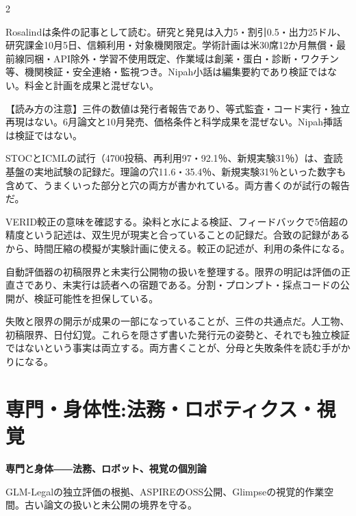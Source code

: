 \documentclass[lualatex,a4paper,10pt]{jlreq}
\begin{document}
\begin{multicols}{2} %

Rosalindは条件の記事として読む。研究と発見は入力5・割引0.5・出力25ドル、研究課金10月5日、信頼利用・対象機関限定。学術計画は米30席12か月無償・最前線同梱・API除外・学習不使用既定、作業域は創薬・蛋白・診断・ワクチン等、機関検証・安全連絡・監視つき。Nipah小話は編集要約であり検証ではない。料金と計画を成果と混ぜない。
\cite{B51,B52,B86,B87}


\begin{tcolorbox}[colback=SurveySoft,colframe=SurveyRule,arc=1mm,boxrule=0.4pt,left=2mm,right=2mm]
【読み方の注意】三件の数値は発行者報告であり、等式監査・コード実行・独立再現はない。6月論文と10月発売、価格条件と科学成果を混ぜない。Nipah挿話は検証ではない。
\end{tcolorbox}
\cite{B46,B83,B44,B43,B45,B47,B84,B48,B50,B85,B49,B51,B86,B52,B87}

STOCとICMLの試行（4700投稿、再利用97・92.1％、新規実験31％）は、査読基盤の実地試験の記録だ。理論の穴11.6・35.4％、新規実験31％といった数字も含めて、うまくいった部分と穴の両方が書かれている。両方書くのが試行の報告だ。
\cite{B50,B85,B49}


VERID較正の意味を確認する。染料と水による検証、フィードバックで5倍超の精度という記述は、双生児が現実と合っていることの記録だ。合致の記録があるから、時間圧縮の模擬が実験計画に使える。較正の記述が、利用の条件になる。
\cite{B46,B83,B44,B43,B45}


自動評価器の初稿限界と未実行公開物の扱いを整理する。限界の明記は評価の正直さであり、未実行は読者への宿題である。分割・プロンプト・採点コードの公開が、検証可能性を担保している。
\cite{B47,B84,B48}


失敗と限界の開示が成果の一部になっていることが、三件の共通点だ。人工物、初稿限界、日付幻覚。これらを隠さず書いた発行元の姿勢と、それでも独立検証ではないという事実は両立する。両方書くことが、分母と失敗条件を読む手がかりになる。
\cite{B46,B83,B44,B43,B45,B47,B84,B48,B50,B85,B49}


\section{専門・身体性:法務・ロボティクス・視覚}
\label{sec:P7}

{\Large\bfseries 専門と身体――法務、ロボット、視覚の個別論\par}
\smallskip
{\color{SurveyMuted}GLM-Legalの独立評価の根拠、ASPIREのOSS公開、Glimpseの視覚的作業空間。古い論文の扱いと未公開の境界を守る。\par}
\bigskip


\end{multicols}
\end{document}
